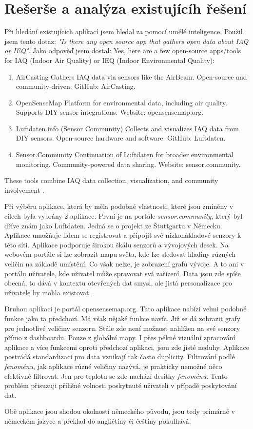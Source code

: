 \chapter{Rešerše a analýza existujícíh řešení}

Při hledání existujících aplikací jsem hledal za pomocí umělé inteligence. Použil jsem tento dotaz: \textit{"Is there any open source app that gathers open data about IAQ or IEQ"}. Jako odpověď jsem dostal: 
Yes, here are a few open-source apps/tools for IAQ (Indoor Air Quality) or IEQ (Indoor Environmental Quality):
	\begin{enumerate}
	\item{AirCasting
	Gathers IAQ data via sensors like the AirBeam.
	Open-source and community-driven.
	GitHub: AirCasting.}
	
	\item{OpenSenseMap
	Platform for environmental data, including air quality.
	Supports DIY sensor integrations.
	Website: opensensemap.org.}
	
	\item{Luftdaten.info (Sensor Community)
	Collects and visualizes IAQ data from DIY sensors.
	Open-source hardware and software.
	GitHub: Luftdaten.}
	
	\item{Sensor.Community
	Continuation of Luftdaten for broader environmental monitoring.
	Community-powered data sharing.
	Website: sensor.community.}
\end{enumerate}
These tools combine IAQ data collection, visualization, and community involvement \parencite{openaiChatGPT2024}.


Při výběru aplikace, která by měla podobné vlastnosti, které jsou zmíněny v cílech byla vybrány 2 aplikace. První je na portále\textit{ sensor.community}, který byl dříve znám jako Luftdaten. Jedná se o projekt ze Štuttgartu v Německu. Aplikace umožňuje lidem se registrovat a připojit své nízkonákladové senzory k této síti. Aplikace podporuje širokou škálu senzorů a vývojových desek. Na webovém portále si lze zobrazit mapu světa, kde lze sledovat hladiny různých veličin na základě umístění. Co však nelze, je zobrazení grafů vývoje. A to ani v portálu uživatele, kde uživatel může spravovat svá zařízení. Data jsou zde spíše obecná, to dává v kontextu otevřených dat smysl, ale jistá personalizace pro uživatele by mohla existovat.

Druhou aplikací je portál opensensemap.org. Tato aplikace nabízí velmi podobné funkce jako ta předchozí. Má však nějaké funkce navíc. Již se dá zobrazit grafy pro jednotlivé veličiny senzoru. Stále zde není možnost nahlížen na své senzory přímo z dashboardu. Pouze z globální mapy. I přes pěkné vizuální zpracování aplikace a více funkcemi oproti předchozí aplikaci, jsou zde jisté neduhy. Aplikace postrádá standardizaci pro data vznikají tak často duplicity. Filtrování podlé \textit{fenoménu}, jak aplikace různé veličiny nazývá, je prakticky nemožné něco efektivně filtrovat. Jen pro teplotu se zde nachází desítky \textit{fenoménů}. Tento problém přisuzuji přílišné volnosti poskytnuté uživateli v případě poskytování dat.

Obě aplikace jsou shodou okolností německého původu, jsou tedy primárně v německém jazyce a překlad do angličtiny či češtiny pokulhává.



